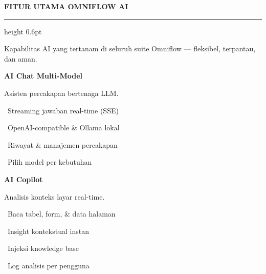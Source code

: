 \documentclass[a4paper]{article}
\newcommand{\sectiontitle}[1]{%
    \vspace{10pt}%
    {\fontsize{13}{16}\selectfont\bfseries\color{BlueDark} #1}\par\vspace{3pt}%
    {\color{BluePrimary}\hrule height 0.6pt}\par\vspace{8pt}%
}
\begin{document}
\sectiontitle{FITUR UTAMA OMNIFLOW AI}

{\fontsize{9.5}{13}\selectfont\color{TextLight} Kapabilitas AI yang tertanam di seluruh suite Omniflow --- fleksibel, terpantau, dan aman.}

\vspace{6pt}

\noindent
\begin{minipage}[t]{0.485\textwidth}
    \colorbox{BluePrimary}{%
        \begin{minipage}{\dimexpr\textwidth-2\fboxsep\relax}
            {\fontsize{10}{13}\selectfont\bfseries\color{White} AI Chat Multi-Model}
        \end{minipage}}\par
    \vspace{4pt}
    {\fontsize{9}{12}\selectfont\color{TextDark}%
    Asisten percakapan bertenaga LLM.\par\vspace{3pt}
    \textbullet\ Streaming jawaban real-time (SSE)\par\vspace{2pt}%
    \textbullet\ OpenAI-compatible \& Ollama lokal\par\vspace{2pt}%
    \textbullet\ Riwayat \& manajemen percakapan\par\vspace{2pt}%
    \textbullet\ Pilih model per kebutuhan}%

\end{minipage}%
\hfill
\begin{minipage}[t]{0.485\textwidth}
    \colorbox{EmeraldPrimary}{%
        \begin{minipage}{\dimexpr\textwidth-2\fboxsep\relax}
            {\fontsize{10}{13}\selectfont\bfseries\color{White} AI Copilot}
        \end{minipage}}\par
    \vspace{4pt}
    {\fontsize{9}{12}\selectfont\color{TextDark}%
    Analisis konteks layar real-time.\par\vspace{3pt}
    \textbullet\ Baca tabel, form, \& data halaman\par\vspace{2pt}%
    \textbullet\ Insight kontekstual instan\par\vspace{2pt}%
    \textbullet\ Injeksi knowledge base\par\vspace{2pt}%
    \textbullet\ Log analisis per pengguna}%

\end{minipage}
\end{document}
